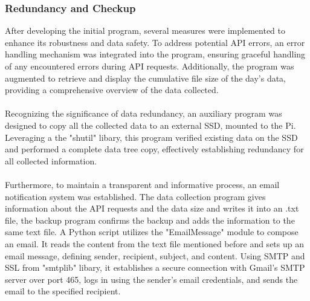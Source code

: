 \subsubsection{Redundancy and Checkup}\label{sec: redundancy}
After developing the initial program, several measures were implemented to enhance its robustness and data safety. To address potential \ac{API} errors, an error handling mechanism was integrated into the program, ensuring graceful handling of any encountered errors during \ac{API} requests. Additionally, the program was augmented to retrieve and display the cumulative file size of the day's data, providing a comprehensive overview of the data collected.\\
\\
Recognizing the significance of data redundancy, an auxiliary program was designed to copy all the collected data to an external \ac{SSD}, mounted to the \ac{Pi}. Leveraging a the "shutil" libary, this program verified existing data on the \ac{SSD} and performed a complete data tree copy, effectively establishing redundancy for all collected information.\\
\\
Furthermore, to maintain a transparent and informative process, an email notification system was established. The data collection program gives information about the \ac{API} requests and the data size and writes it into an .txt file, the backup program confirms the backup and adds the information to the same text file. A Python script utilizes the "EmailMessage" module to compose an email. It reads the content from the text file mentioned before and sets up an email message, defining sender, recipient, subject, and content. Using \ac{SMTP} and \ac{SSL} from "smtplib" libary, it establishes a secure connection with Gmail's \Ac{SMTP} server over port 465, logs in using the sender's email credentials, and sends the email to the specified recipient.\\
